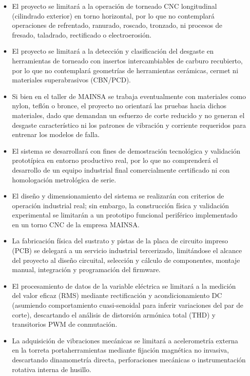 \begin{itemize}
\setlength{\itemsep}{2.5pt}
\setlength{\parsep}{1pt}
\item El proyecto se limitará a la operación de torneado CNC longitudinal (cilindrado exterior) en torno horizontal, por lo que no contemplará operaciones de refrentado, ranurado, roscado, tronzado, ni procesos de fresado, taladrado, rectificado o electroerosión.
\item El proyecto se limitará a la detección y clasificación del desgaste en herramientas de torneado con insertos intercambiables de carburo recubierto, por lo que no contemplará geometrías de herramientas cerámicas, cermet ni materiales superabrasivos (CBN/PCD).
\item Si bien en el taller de MAINSA se trabaja eventualmente con materiales como nylon, teflón o bronce, el proyecto no orientará las pruebas hacia dichos materiales, dado que demandan un esfuerzo de corte reducido y no generan el desgaste característico ni los patrones de vibración y corriente requeridos para entrenar los modelos de falla.
\item El sistema se desarrollará con fines de demostración tecnológica y validación prototípica en entorno productivo real, por lo que no comprenderá el desarrollo de un equipo industrial final comercialmente certificado ni con homologación metrológica de serie.
\item El diseño y dimensionamiento del sistema se realizarán con criterios de operación industrial real; sin embargo, la construcción física y validación experimental se limitarán a un prototipo funcional periférico implementado en un torno CNC de la empresa MAINSA.
\item La fabricación física del sustrato y pistas de la placa de circuito impreso (PCB) se delegará a un servicio industrial tercerizado, limitándose el alcance del proyecto al diseño circuital, selección y cálculo de componentes, montaje manual, integración y programación del firmware.
\item El procesamiento de datos de la variable eléctrica se limitará a la medición del valor eficaz (RMS) mediante rectificación y acondicionamiento DC (asumiendo comportamiento cuasi-senoidal para inferir variaciones del par de corte), descartando el análisis de distorsión armónica total (THD) y transitorios PWM de conmutación.
\item La adquisición de vibraciones mecánicas se limitará a acelerometría externa en la torreta portaherramientas mediante fijación magnética no invasiva, descartando dinamometría directa, perforaciones mecánicas o instrumentación rotativa interna de husillo.

\end{itemize}
